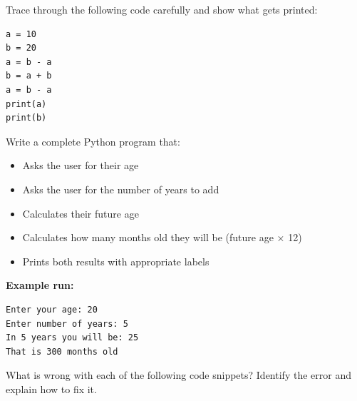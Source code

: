 \documentclass{csexam}
\begin{document}
\begin{questions}
\question[8] Trace through the following code carefully and show what gets printed:
\begin{lstlisting}
a = 10
b = 20
a = b - a
b = a + b
a = b - a
print(a)
print(b)
\end{lstlisting}
\vspace{3cm}

\newpage

\question[14] Write a complete Python program that:
\begin{itemize}
    \item Asks the user for their age
    \item Asks the user for the number of years to add
    \item Calculates their future age
    \item Calculates how many months old they will be (future age × 12)
    \item Prints both results with appropriate labels
\end{itemize}

\textbf{Example run:}
\begin{verbatim}
Enter your age: 20
Enter number of years: 5
In 5 years you will be: 25
That is 300 months old
\end{verbatim}

\vspace{8cm}

\newpage

\question[8] What is wrong with each of the following code snippets? Identify the error and explain how to fix it.

\end{questions}
\end{document}
